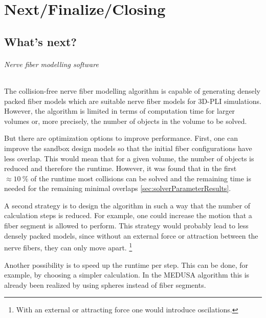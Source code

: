 \newpage\null\thispagestyle{empty}\newpage
\clearpage{\thispagestyle{empty}\cleardoublepage}
\part{Next/Finalize/Closing}
% 
% 
% 
\setcounter{chapter}{9}
\chapter{What's next?}
\label{sec:outlook}
% 
\paragraph{Nerve fiber modelling software}
% 
The collision-free nerve fiber modelling algorithm is capable of generating densely packed fiber models which are suitable nerve fiber models for \ac{3D-PLI} simulations.
However, the algorithm is limited in terms of computation time for larger volumes or, more precisely, the number of objects in the volume to be solved.
\par
% 
But there are optimization options to improve performance.
First, one can improve the sandbox design models so that the initial fiber configurations have less overlap.
This would mean that for a given volume, the number of objects is reduced and therefore the runtime.
However, it was found that in the first $\approx \SI{10}{\percent}$ of the runtime most collisions can be solved and the remaining time is needed for the remaining minimal overlaps \cref{sec:solverParameterResults}.
\par
% 
A second strategy is to design the algorithm in such a way that the number of calculation steps is reduced.
For example, one could increase the motion that a fiber segment is allowed to perform.
This strategy would probably lead to less densely packed models, since without an external force or attraction between the nerve fibers, they can only move apart. \footnote{With an external or attracting force one would introduce oscilations.}
% 
\par
Another possibility is to speed up the runtime per step.
This can be done, for example, by choosing a simpler calculation.
In the \ac{MEDUSA} algorithm this is already been realized by using spheres instead of fiber segments.
